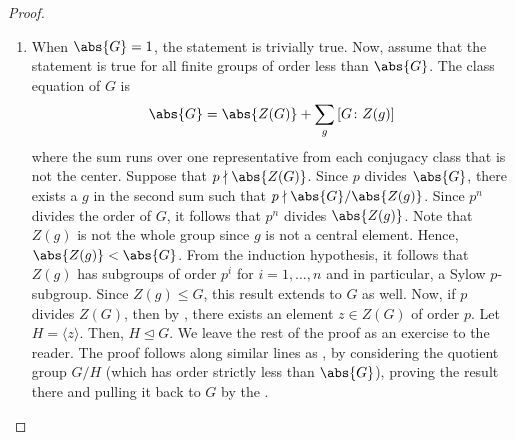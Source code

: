 \begin{proof}
    \phantom{hi}
    \begin{enumerate}
        \item When $\abs{G} = 1$, the statement is trivially true. Now, assume that the statement is true for all finite groups of order less than $\abs{G}$. The class equation of $G$ is
        \[
            \abs{G} = \abs{Z(G)} + \sum_{g} \left[ G \colon Z(g) \right]
        \]
        where the sum runs over one representative from each conjugacy class that is not the center. Suppose that $p \notdivides \abs{Z(G)}$. Since $p$ divides $\abs{G}$, there exists a $g$ in the second sum such that $p \notdivides \abs{G}/\abs{Z(g)}$. Since $p^n$ divides the order of $G$, it follows that $p^n$ divides $\abs{Z(g)}$. Note that $Z(g)$ is not the whole group since $g$ is not a central element. Hence, $\abs{Z(g)} < \abs{G}$. From the induction hypothesis, it follows that $Z(g)$ has subgroups of order $p^i$ for $i = 1, \ldots, n$ and in particular, a Sylow $p$-subgroup. Since $Z(g) \leq G$, this result extends to $G$ as well. Now, if $p$ divides $Z(G)$, then by , there exists an element $z \in Z(G)$ of order $p$. Let $H = \langle z \rangle$. Then, $H \trianglelefteq G$. We leave the rest of the proof as an exercise to the reader. The proof follows along similar lines as , by considering the quotient group $G/H$ (which has order strictly less than $\abs{G}$), proving the result there and pulling it back to $G$ by the .
        

\end{enumerate}
\end{proof}
